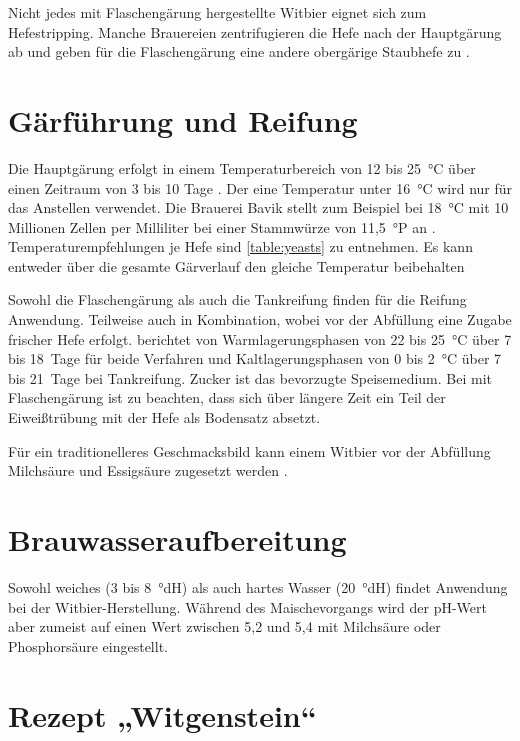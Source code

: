 \documentclass[a4paper,parskip=half]{scrartcl}
\begin{document}
Nicht jedes mit Flaschengärung hergestellte Witbier eignet sich zum
Hefestripping. Manche Brauereien zentrifugieren die Hefe nach
der Hauptgärung ab und geben für die Flaschengärung eine
andere obergärige Staubhefe zu \parencite[43]{Strottner1999}.

\section*{Gärführung und Reifung}

Die Hauptgärung erfolgt in einem Temperaturbereich von 12 bis 25~°C
über einen Zeitraum von 3 bis 10 Tage \parencite[13,18]{Strottner1999}.
Der eine Temperatur unter 16~°C wird nur für das Anstellen verwendet.
Die Brauerei Bavik stellt zum Beispiel bei 18~°C mit 10 Millionen Zellen
per Milliliter bei einer Stammwürze von 11,5~°P an \parencite[63]{Hieronymus2010}.
Temperaturempfehlungen je Hefe sind \autoref{table:yeasts} zu entnehmen.
Es kann entweder über die gesamte Gärverlauf den gleiche Temperatur beibehalten

Sowohl die Flaschengärung als auch die Tankreifung finden für die Reifung
Anwendung. Teilweise auch in Kombination, wobei vor der Abfüllung eine
Zugabe frischer Hefe erfolgt. \citeauthor{Strottner1999} berichtet
von Warmlagerungsphasen von 22 bis 25~°C über 7 bis 18~Tage für beide
Verfahren und Kaltlagerungsphasen von 0 bis 2~°C über 7 bis 21~Tage
bei Tankreifung. Zucker ist das bevorzugte Speisemedium. Bei mit Flaschengärung
ist zu beachten, dass sich über längere Zeit ein Teil der Eiweißtrübung
mit der Hefe als Bodensatz absetzt. \parencite[13\psq,18]{Strottner1999}

Für ein traditionelleres Geschmacksbild kann einem Witbier vor
der Abfüllung Milchsäure und Essigsäure zugesetzt werden
\parencite[18]{Strottner1999}.

\section*{Brauwasseraufbereitung}

Sowohl weiches (3 bis 8~°dH) als auch hartes Wasser (20~°dH) findet
Anwendung bei der Witbier-Herstellung. Während des Maischevorgangs
wird der pH-Wert aber zumeist auf einen Wert zwischen 5,2 und
5,4 mit Milchsäure oder Phosphorsäure eingestellt. \parencite[14]{Strottner1999}

\section*{Rezept „Witgenstein“}
\end{document}
